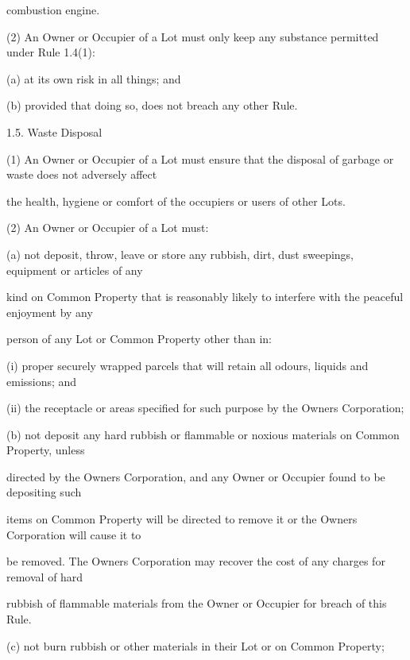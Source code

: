 \documentclass{article}
\begin{document}
{\fontsize{10.02}{1}combustion engine. }

{\fontsize{9.962}{1}(2) An Owner or Occupier of a Lot must only keep any substance permitted under Rule 1.4(1): }

{\fontsize{9.962}{1}(a) at its own risk in all things; and }

{\fontsize{9.962}{1}(b) provided that doing so, does not breach any other Rule. }

{\fontsize{9.99}{1}1.5. Waste Disposal }

{\fontsize{9.962}{1}(1) An Owner or Occupier of a Lot must ensure that the disposal of garbage or waste does not adversely affect }

{\fontsize{10.02}{1}the health, hygiene or comfort of the occupiers or users of other Lots. }

{\fontsize{9.962}{1}(2) An Owner or Occupier of a Lot must: }

{\fontsize{9.962}{1}(a) not deposit, throw, leave or store any rubbish, dirt, dust sweepings, equipment or articles of any }

{\fontsize{10.02}{1}kind on Common Property that is reasonably likely to interfere with the peaceful enjoyment by any }

{\fontsize{10.02}{1}person of any Lot or Common Property other than in: }

{\fontsize{9.962}{1}(i) proper securely wrapped parcels that will retain all odours, liquids and emissions; and }

{\fontsize{9.962}{1}(ii) the receptacle or areas specified for such purpose by the Owners Corporation; }

{\fontsize{9.962}{1}(b) not deposit any hard rubbish or flammable or noxious materials on Common Property, unless }

{\fontsize{10.02}{1}directed by the Owners Corporation, and any Owner or Occupier found to be depositing such }

{\fontsize{10.02}{1}items on Common Property will be directed to remove it or the Owners Corporation will cause it to }

{\fontsize{10.02}{1}be removed. The Owners Corporation may recover the cost of any charges for removal of hard }

{\fontsize{10.02}{1}rubbish of flammable materials from the Owner or Occupier for breach of this Rule. }

{\fontsize{9.962}{1}(c) not burn rubbish or other materials in their Lot or on Common Property; }
\end{document}
